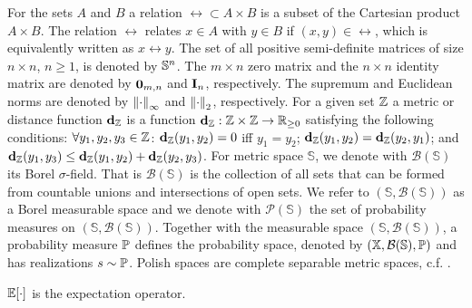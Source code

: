 \documentclass{ifacconf}
\begin{document}
For the sets $A$ and $B$ a relation $\rel\subset A\times B$ is a subset of the Cartesian product $A\times B$. The relation $\rel$ relates $x\in A$ with $y\in B$ if $(x,y)\in\rel$, which is equivalently written as $x\rel y$.
%
%
%
%
%    
%   
%    
%    
    The set of all positive semi-definite matrices of size
    $n \times n$, $n \geq 1$, is denoted by $\S^n$.    The $m \times n$ zero matrix and
    the $n \times n$ identity matrix are denoted by
    $\BF{0}_{m, n}$ and $\BF{I}_n$, respectively.
    The supremum and Euclidean norms are denoted by
    $\norminf{\cdot}$ and $\normeucl{\cdot}$, respectively.
    For a given set $\Z$ a metric or distance function $\mathbf d_\Z$ is a function $\mathbf{d}_\Z: \Z\times \Z\rightarrow \mathbb R_{\ge 0}$ 
satisfying the following conditions: 
$\forall y_1,y_2,y_3\in\Z$:
$\mathbf d_\Z(y_1,y_2)=0$ iff $y_1=y_2$; 
$\mathbf d_\Z(y_1,y_2)=\mathbf d_{\Z}(y_2,y_1)$;  and
$\mathbf d_\Z(y_1,y_3)\leq \mathbf d_\Z(y_1,y_2) +\mathbf d_\Z(y_2,y_3)$. 
For metric space $\mathbb S$, we denote with  $\mathcal{B}(\mathbb S)$ its Borel $\sigma$-field. That is  $\mathcal{B}(\mathbb S)$ is the  
collection of all sets that can be formed from countable unions and intersections of open sets.
We refer to  $(\mathbb S,\mathcal{B}(\mathbb S))$ as a Borel measurable space and we denote with $\mathcal P(\mathbb S)$ the set of probability measures on $(\mathbb S,\mathcal{B}(\mathbb S))$.
Together with the measurable space $(\mathbb S,\mathcal{B}(\mathbb S))$,  a probability measure $\po$ defines the probability space, denoted by $(\X,\mathcal{B}(\mathbb S),\po)$ and has realizations  $s\sim \po$.   
Polish spaces are complete separable metric spaces, c.f. \cite{bogachev2007measure}. 

    $\BB{E}[\cdot]$ is the expectation operator.
\end{document}
